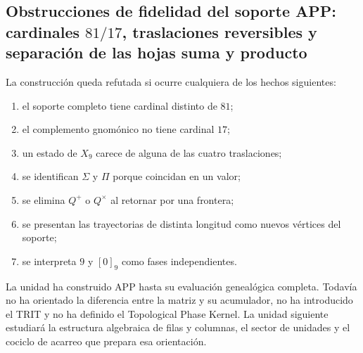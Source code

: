 \subsection{Obstrucciones de fidelidad del soporte APP: cardinales \(81/17\), traslaciones reversibles y separación de las hojas suma y producto}

\begin{criterion}
La construcción queda refutada si ocurre cualquiera de los hechos
siguientes:
\begin{enumerate}
 \item el soporte completo tiene cardinal distinto de \(81\);
 \item el complemento gnomónico no tiene cardinal \(17\);
 \item un estado de \(X_9\) carece de alguna de las cuatro traslaciones;
 \item se identifican \(\Sigma\) y \(\Pi\) porque coincidan en un valor;
 \item se elimina \(Q^+\) o \(Q^\times\) al retornar por una frontera;
 \item se presentan las trayectorias de distinta longitud como nuevos
       vértices del soporte;
 \item se interpreta \(9\) y \([0]_9\) como fases independientes.
\end{enumerate}
\end{criterion}

La unidad ha construido APP hasta su evaluación genealógica completa. Todavía
no ha orientado la diferencia entre la matriz y su acumulador, no ha
introducido el TRIT
y no ha definido el Topological Phase Kernel. La unidad siguiente estudiará
la estructura algebraica de filas y columnas, el sector de unidades y el
cociclo de acarreo que prepara esa orientación.



